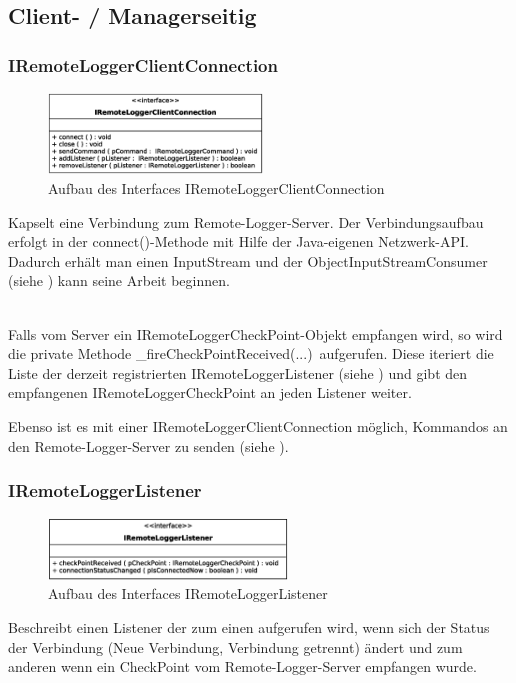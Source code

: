 \subsection{Client- / Managerseitig}
\subsubsection{IRemoteLoggerClientConnection} \label{sec:IRemoteLoggerClientConnection}
\begin{figure}
	\vspace{-20px} \hspace{5px}
	\includegraphics[width=215px]{../img/CD-IRemoteLoggerClientConnection.eps}
	\caption{Aufbau des Interfaces \glqq IRemoteLoggerClientConnection\grqq}
\end{figure}
\par Kapselt eine Verbindung zum Remote-Logger-Server. Der Verbindungsaufbau erfolgt in der \glqq connect()\grqq-Methode mit Hilfe der Java-eigenen Netzwerk-API. Dadurch erhält man einen InputStream und der ObjectInputStreamConsumer (siehe ) kann seine Arbeit beginnen.
\vspace{7px}

\\
Falls vom Server ein \glqq IRemoteLoggerCheckPoint\grqq-Objekt empfangen wird, so wird die private Methode \glqq \_fireCheckPointReceived(...)\grqq\ aufgerufen. Diese iteriert die Liste der derzeit registrierten IRemoteLoggerListener (siehe ) und gibt den empfangenen IRemoteLoggerCheckPoint an jeden Listener weiter.
\par Ebenso ist es mit einer IRemoteLoggerClientConnection möglich, Kommandos an den Remote-Logger-Server zu senden (siehe ).

\vspace{-5px}
\subsubsection{IRemoteLoggerListener} \label{sec:IRemoteLoggerListener}
\begin{figure}
	\vspace{-17px} \hspace{5px}
	\includegraphics[width=240px]{../img/CD-IRemoteLoggerListener.eps}
	\caption{Aufbau des Interfaces \glqq IRemoteLoggerListener\grqq}
\end{figure}
\par Beschreibt einen Listener der zum einen aufgerufen wird, wenn sich der Status der Verbindung (Neue Verbindung, Verbindung getrennt) ändert und zum anderen wenn ein CheckPoint vom Remote-Logger-Server empfangen wurde.

